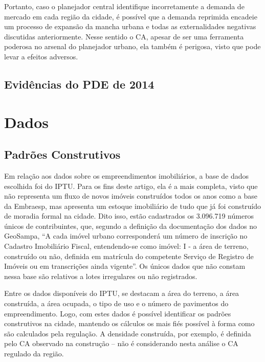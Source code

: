 \begin{figure}[h]
    \caption{Impacto da regulação no CA da cidade}
    \centering
    \begin{subfigure}{.6\linewidth}
        
    \end{subfigure}
    \label{fig:FAR}
\end{figure}

Portanto, caso o planejador central identifique incorretamente a demanda de mercado em cada região da cidade, é possível que a demanda reprimida encadeie um processo de expansão da mancha urbana e todas as externalidades negativas discutidas anteriormente. Nesse sentido o CA, apesar de ser uma ferramenta poderosa no arsenal do planejador urbano, ela também é perigosa, visto que pode levar a efeitos adversos. 

\section{Evidências do PDE de 2014}


\chapter{Dados}
\label{chp:dados}

\section{Padrões Construtivos}
\label{sec:dadosIPTU}

Em relação aos dados sobre os empreendimentos imobiliários, a base de dados escolhida foi do IPTU. Para os fins deste artigo, ela é a mais completa, visto que não representa um fluxo de novos imóveis construídos todos os anos como a base da Embraesp, mas apresenta um estoque imobiliário de tudo que já foi construído de moradia formal na cidade. Dito isso, estão cadastrados os 3.096.719 números únicos de contribuintes, que, segundo a definição da documentação dos dados no GeoSampa, ``A cada imóvel urbano corresponderá um número de inscrição no Cadastro Imobiliário Fiscal, entendendo-se como imóvel: I - a área de terreno, construído ou não, definida em matrícula do competente Serviço de Registro de Imóveis ou em transcrições ainda vigente''. Os únicos dados que não constam nessa base são relativos a lotes irregulares ou não registrados.

Entre os dados disponíveis do IPTU, se destacam a área do terreno, a área construída, a área ocupada, o tipo de uso e o número de pavimentos do empreendimento. Logo, com estes dados é possível identificar os padrões construtivos na cidade, mantendo os cálculos os mais fiés possível à forma como são calculados pela regulação. A densidade construída, por exemplo, é definida pelo CA observado na construção -- não é considerando nesta análise o CA regulado da região. 

